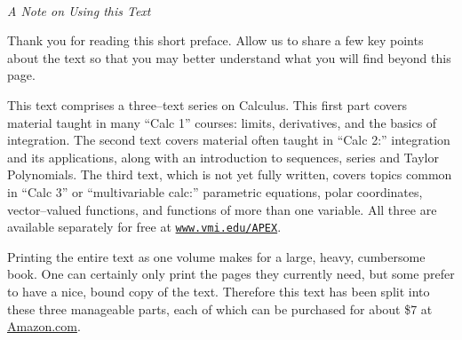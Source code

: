 \thispagestyle{empty}
\Huge
{}\\
\large
\emph{A Note on Using this Text}
\vspace{1in}
\normalsize

Thank you for reading this short preface. Allow us to share a few key points about the text so that you may better understand what you will find beyond this page.

This text comprises a three--text series on Calculus. This first part covers material taught in many ``Calc 1'' courses: limits, derivatives, and the basics of integration. The second text covers material often taught in ``Calc 2:'' integration and its applications, along with an introduction to sequences, series and Taylor Polynomials. The third text, which is not yet fully written, covers topics common in ``Calc 3'' or ``multivariable calc:'' parametric equations, polar coordinates, vector--valued functions, and functions of more than one variable. All three are available separately for free at \texttt{\href{http://www.vmi.edu/APEX}{www.vmi.edu/APEX}}. %

Printing the entire text as one volume makes for a large, heavy, cumbersome book. One can certainly only print the pages they currently need, but some prefer to have a nice, bound copy of the text. Therefore this text has been split into these three manageable parts, each of which can be purchased for about \$7 at \href{http://amazon.com}{Amazon.com}.\\ 


